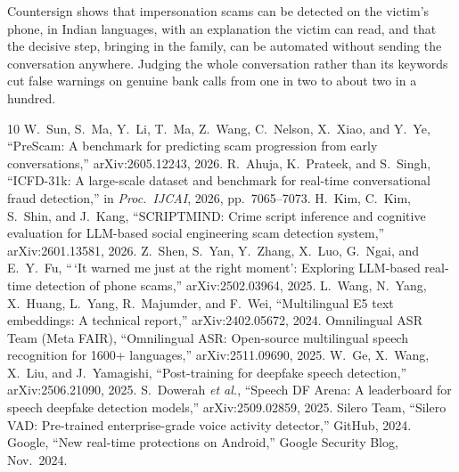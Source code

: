 \documentclass[conference,a4paper]{IEEEtran}
\begin{document}
Countersign shows that impersonation scams can be detected on the victim's phone, in Indian languages, with an
explanation the victim can read, and that the decisive step, bringing in the family, can be automated without
sending the conversation anywhere. Judging the whole conversation rather than its keywords cut false warnings on
genuine bank calls from one in two to about two in a hundred.

\begin{thebibliography}{10}
 W.~Sun, S.~Ma, Y.~Li, T.~Ma, Z.~Wang, C.~Nelson, X.~Xiao, and Y.~Ye, ``PreScam: A benchmark for predicting scam progression from early conversations,'' arXiv:2605.12243, 2026.
 R.~Ahuja, K.~Prateek, and S.~Singh, ``ICFD-31k: A large-scale dataset and benchmark for real-time conversational fraud detection,'' in \emph{Proc.\ IJCAI}, 2026, pp.~7065--7073.
 H.~Kim, C.~Kim, S.~Shin, and J.~Kang, ``SCRIPTMIND: Crime script inference and cognitive evaluation for LLM-based social engineering scam detection system,'' arXiv:2601.13581, 2026.
 Z.~Shen, S.~Yan, Y.~Zhang, X.~Luo, G.~Ngai, and E.~Y.~Fu, ``\,`It warned me just at the right moment': Exploring LLM-based real-time detection of phone scams,'' arXiv:2502.03964, 2025.
 L.~Wang, N.~Yang, X.~Huang, L.~Yang, R.~Majumder, and F.~Wei, ``Multilingual E5 text embeddings: A technical report,'' arXiv:2402.05672, 2024.
 Omnilingual ASR Team (Meta FAIR), ``Omnilingual ASR: Open-source multilingual speech recognition for 1600+ languages,'' arXiv:2511.09690, 2025.
 W.~Ge, X.~Wang, X.~Liu, and J.~Yamagishi, ``Post-training for deepfake speech detection,'' arXiv:2506.21090, 2025.
 S.~Dowerah \emph{et al.}, ``Speech DF Arena: A leaderboard for speech deepfake detection models,'' arXiv:2509.02859, 2025.
 Silero Team, ``Silero VAD: Pre-trained enterprise-grade voice activity detector,'' GitHub, 2024.
 Google, ``New real-time protections on Android,'' Google Security Blog, Nov.~2024.
\end{thebibliography}
\end{document}
